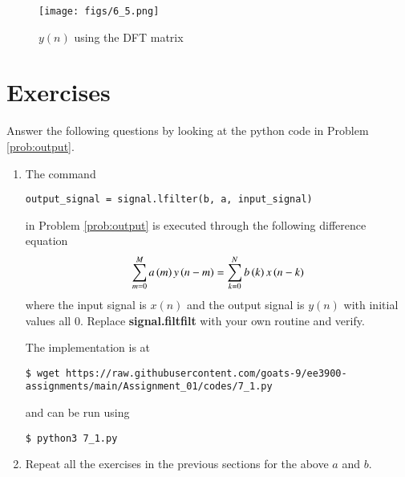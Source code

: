 \documentclass[journal,12pt,twocolumn]{IEEEtran}
\renewcommand\thesection{\arabic{section}}
\begin{document}
\begin{figure}[!htb]
	\centering
	\texttt{[image: figs/6\_5.png]}
	\caption{$y(n)$ using the DFT matrix}
	\label{fig:yn-mtx}
\end{figure}

\section{Exercises}
\noindent Answer the following questions by looking at the python code in Problem \ref{prob:output}.
\begin{enumerate}[label=\thesection.\arabic*]
\item
The command
\begin{lstlisting}
output_signal = signal.lfilter(b, a, input_signal)
\end{lstlisting}
in Problem \ref{prob:output} is executed through the following difference equation
\begin{equation}
\label{eq:iir_filter_gen}
 \sum _{m=0}^{M}a\left(m\right)y\left(n-m\right)=\sum _{k=0}^{N}b\left(k\right)x\left(n-k\right)
\end{equation}
where the input signal is $x(n)$ and the output signal is $y(n)$ with initial values all 0. Replace
\textbf{signal.filtfilt} with your own routine and verify.

\solution
The implementation is at
\begin{lstlisting}
$ wget https://raw.githubusercontent.com/goats-9/ee3900-assignments/main/Assignment_01/codes/7_1.py
\end{lstlisting}
and can be run using
\begin{lstlisting}
$ python3 7_1.py
\end{lstlisting}
\item Repeat all the exercises in the previous sections for the above $a$ and $b$.


\end{enumerate}
\end{document}
